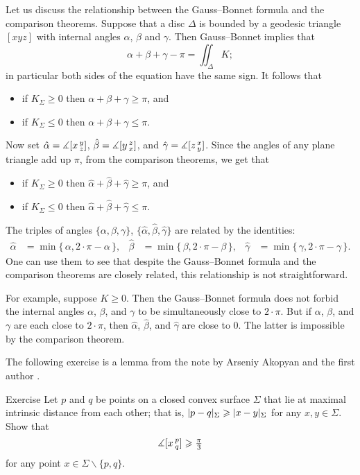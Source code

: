 Let us discuss the relationship between the Gauss--Bonnet formula and the comparison theorems.
Suppose that a disc $\Delta$ is bounded by a geodesic triangle $[xyz]$ with internal angles $\alpha$, $\beta$ and $\gamma$.
Then Gauss--Bonnet implies that 
\[\alpha+\beta+\gamma-\pi=\iint_\Delta K;\]
in particular both sides of the equation have the same sign.
It follows that
\begin{itemize}
\item if $K_\Sigma\ge 0$ then $\alpha+\beta+\gamma\ge\pi$, and
\item if $K_\Sigma\le 0$ then $\alpha+\beta+\gamma\le\pi$.
\end{itemize}

Now set 
$\hat\alpha=\measuredangle[x\,{}^{y}_{z}]$,
$\hat\beta=\measuredangle[y\,{}^{z}_{x}]$,
and $\hat\gamma=\measuredangle[z\,{}^{x}_{y}]$.
Since the angles of any plane triangle add up $\pi$, from the comparison theorems, we get that
\begin{itemize}
\item if $K_\Sigma\ge 0$ then $\hat\alpha+\hat\beta+\hat\gamma\ge\pi$, and
\item if $K_\Sigma\le 0$ then $\hat\alpha+\hat\beta+\hat\gamma\le\pi$.
\end{itemize}

The triples of angles $\{ \alpha , \beta , \gamma \}$, $\{   \hat\alpha , \hat\beta , \hat\gamma   \}$ are related by the identities:
\begin{align*}
\hat \alpha&=\min\{\,\alpha,2\cdot\pi-\alpha\,\},
&
\hat\beta &=\min\{\,\beta,2\cdot\pi-\beta\,\},
&
\hat\gamma&=\min\{\,\gamma,2\cdot\pi-\gamma\,\}.
\end{align*}
One can use them to see that despite the Gauss--Bonnet formula and the comparison theorems are closely related,
this relationship is not straightforward.

For example, suppose $K\ge 0$.
Then the Gauss--Bonnet formula does not forbid the internal angles $\alpha$, $\beta$, and $\gamma$ to be simultaneously close to $2\cdot\pi$.
But if $\alpha$, $\beta$, and $\gamma$ are each close to $2\cdot\pi$, then $\hat\alpha$, $\hat\beta$, and $\hat\gamma$ are close to $0$.
The latter is impossible by the comparison theorem.

The following exercise is a lemma from the note by Arseniy Akopyan and the first author \cite{akopyan-petrunin}.

\begin{thm}{Exercise}\label{ex:diam-angle}
Let $p$ and $q$ be points on a closed convex surface $\Sigma$ that lie at maximal intrinsic distance from each other;
that is, $\dist{p}{q}\Sigma\z\ge\dist{x}{y}\Sigma$ for any $x,y\in \Sigma$.
Show that 
\[\measuredangle[x\,{}^{p}_{q}]\geqslant \tfrac\pi3\]
for any point $x\in \Sigma\backslash\{p,q\}$.
\end{thm}

